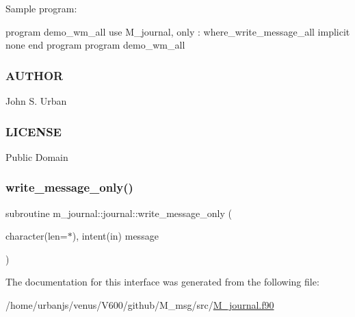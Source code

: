 Sample program\+:

program demo\+\_\+wm\+\_\+all use M\+\_\+journal, only \+: where\+\_\+write\+\_\+message\+\_\+all implicit none end program program demo\+\_\+wm\+\_\+all \subsubsection*{A\+U\+T\+H\+OR}

John S. Urban \subsubsection*{L\+I\+C\+E\+N\+SE}

Public Domain \mbox{\label{interfacem__journal_1_1journal_a1cb40f602a1e1c546bce71652a779d31}} 
\subsubsection{\texorpdfstring{write\+\_\+message\+\_\+only()}{write\_message\_only()}}
{\footnotesize\ttfamily subroutine m\+\_\+journal\+::journal\+::write\+\_\+message\+\_\+only (\begin{DoxyParamCaption}\item[{character(len=$\ast$), intent(in)}]{message }\end{DoxyParamCaption})\hspace{0.3cm}{\ttfamily [private]}}



The documentation for this interface was generated from the following file\+:\begin{DoxyCompactItemize}
\item 
/home/urbanjs/venus/\+V600/github/\+M\+\_\+msg/src/\mbox{\hyperlink{M__journal_8f90}{M\+\_\+journal.\+f90}}\end{DoxyCompactItemize}
